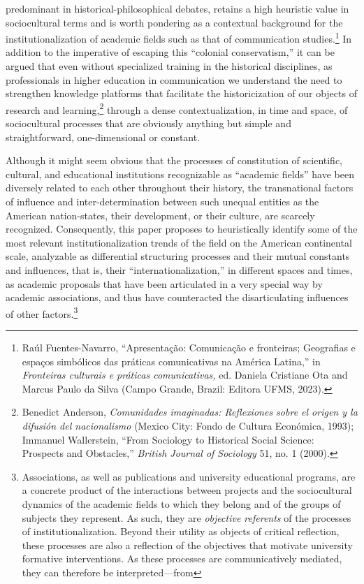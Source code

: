 \documentclass{tufte-handout}
\begin{document}
predominant in historical-philosophical debates, retains a high
heuristic value in sociocultural terms and is worth pondering as a
contextual background for the institutionalization of academic fields
such as that of communication studies.\footnote{Raúl Fuentes-Navarro,
  ``Apresentação: Comunicação e fronteiras; Geografias e espaços
  simbólicos das práticas comunicativas na América Latina,'' in
  \emph{Fronteiras culturais e práticas comunicativas,} ed. Daniela
  Cristiane Ota and Marcus Paulo da Silva (Campo Grande, Brazil: Editora
  UFMS, 2023).} In addition to the imperative of escaping this
``colonial conservatism,'' it can be argued that even without
specialized training in the historical disciplines, as professionals in
higher education in communication we understand the need to strengthen
knowledge platforms that facilitate the historicization of our objects
of research and learning,\footnote{Benedict Anderson, \emph{Comunidades
  imaginadas: Reflexiones sobre el origen y la difusión del
  nacionalismo} (Mexico City: Fondo de Cultura Económica, 1993);
  Immanuel Wallerstein, ``From Sociology to Historical Social Science:
  Prospects and Obstacles,'' \emph{British Journal of Sociology} 51, no.
  1 (2000).} through a dense contextualization, in time and space, of
sociocultural processes that are obviously anything but simple and
straightforward, one-dimensional or constant.

Although it might seem obvious that the processes of constitution of
scientific, cultural, and educational institutions recognizable as
``academic fields'' have been diversely related to each other throughout
their history, the transnational factors of influence and
inter-determination between such unequal entities as the American
nation-states, their development, or their culture, are scarcely
recognized. Consequently, this paper proposes to heuristically identify
some of the most relevant institutionalization trends of the field on
the American continental scale, analyzable as differential structuring
processes and their mutual constants and influences, that is, their
``internationalization,'' in different spaces and times, as academic
proposals that have been articulated in a very special way by academic
associations, and thus have counteracted the disarticulating influences
of other factors.\footnote{Associations, as well as publications and
  university educational programs, are a concrete product of the
  interactions between projects and the sociocultural dynamics of the
  academic fields to which they belong and of the groups of subjects
  they represent. As such, they are \emph{objective referents} of the
  processes of institutionalization. Beyond their utility as objects of
  critical reflection, these processes are also a reflection of the
  objectives that motivate university formative interventions. As these
  processes are communicatively mediated, they can therefore be
  interpreted---from}
\end{document}
